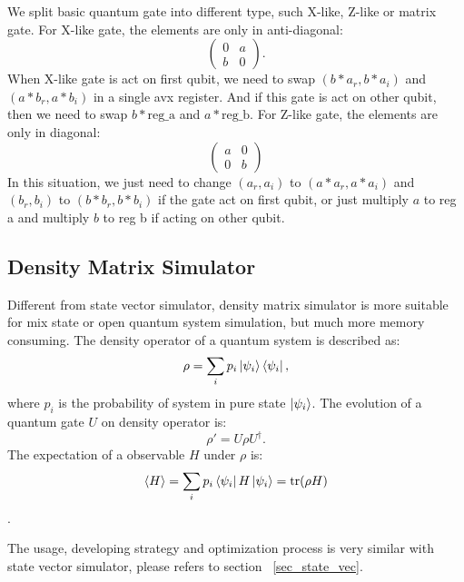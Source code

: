 We split basic quantum gate into different type, such X-like, Z-like or matrix gate. For X-like gate, the elements are only in anti-diagonal:
\begin{equation}
    \begin{pmatrix}
        0 & a \\
        b & 0
    \end{pmatrix}.
\end{equation}
When X-like gate is act on first qubit, we need to swap $(b*a_r, b*a_i)$ and $(a*b_r, a*b_i)$ in a single avx register. And if this gate is act on other qubit, then we need to swap $b*\text{reg\_a}$ and $a*\text{reg\_b}$. For Z-like gate, the elements are only in diagonal:
\begin{equation}
    \begin{pmatrix}
        a & 0 \\
        0 & b
    \end{pmatrix}
\end{equation}
In this situation, we just need to change $(a_r, a_i)$ to $(a*a_r, a*a_i)$ and $(b_r, b_i)$ to $(b*b_r, b*b_i)$ if the gate act on first qubit, or just multiply $a$ to reg a and multiply $b$ to reg b if acting on other qubit.

\subsection{Density Matrix Simulator}
Different from state vector simulator, density matrix simulator is more suitable for mix state or open quantum system simulation, but much more memory consuming. The density operator of a quantum system is described as:
\begin{equation}
    \rho=\sum_ip_i\ket{\psi_i}\bra{\psi_i},
\end{equation}
where $p_i$ is the probability of system in pure state $\ket{\psi_i}$. The evolution of a quantum gate $U$ on density operator is:
\begin{equation}
    \rho'=U\rho U^\dagger.
\end{equation}
The expectation of a observable $H$ under $\rho$ is:
\begin{equation}
    \left<H\right> = \sum_ip_i\bra{\psi_i}H\ket{\psi_i}=\text{tr}(\rho H)
\end{equation}.

The usage, developing strategy and optimization process is very similar with state vector simulator, please refers to section ~\ref{sec_state_vec}.
